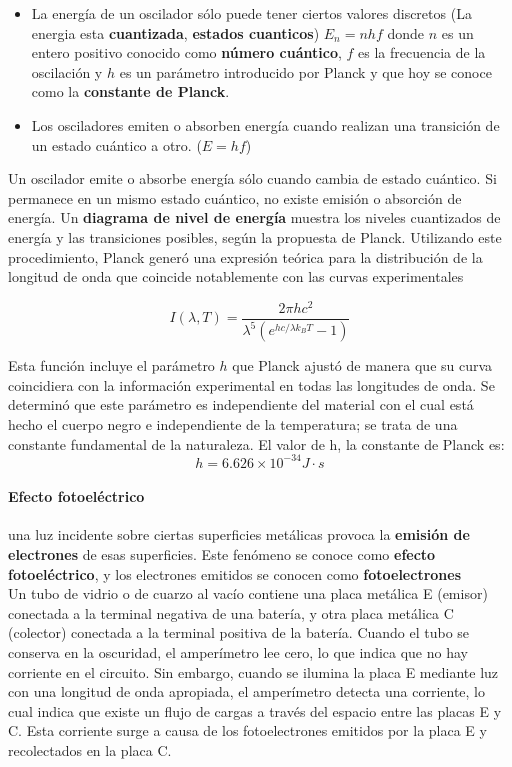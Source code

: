 \documentclass[10pt]{article}
\begin{document}
\begin{itemize}
	\item La energía de un oscilador sólo puede tener ciertos valores discretos (La energia esta \textbf{cuantizada}, \textbf{estados cuanticos}) $E_n = nhf$ donde $n$ es un entero positivo conocido como \textbf{número cuántico}, $f$ es la frecuencia de la oscilación y $h$ es un parámetro introducido por Planck y que hoy se conoce como la \textbf{constante de Planck}.
	\item Los osciladores emiten o absorben energía cuando realizan una transición de un estado cuántico a otro. ($E = hf$)
\end{itemize}

Un oscilador emite o absorbe energía sólo cuando cambia de estado cuántico. Si permanece en un mismo estado cuántico, no existe emisión o absorción de energía. Un \textbf{diagrama de nivel de energía} muestra los niveles cuantizados de energía y las transiciones posibles, según la propuesta de Planck. Utilizando este procedimiento, Planck generó una expresión teórica para la distribución de la longitud de onda que coincide notablemente con las curvas experimentales

\begin{equation*}
	I(\lambda, T) = \dfrac{2\pi hc^2}{\lambda^5 (e^{hc/\lambda k_B T}-1)}
\end{equation*}

Esta función incluye el parámetro $h$ que Planck ajustó de manera que su curva coincidiera con la información experimental en todas las longitudes de onda. Se determinó que este parámetro es independiente del material con el cual está hecho el cuerpo negro e independiente de la temperatura; se trata de una constante fundamental de la naturaleza. El valor de h, la constante de Planck es:
\begin{equation*}
		h = 6.626 \times 10^{-34} J \cdot s
\end{equation*}

\paragraph{Efecto fotoeléctrico}

una luz incidente sobre ciertas superficies metálicas provoca la \textbf{emisión de electrones} de esas superficies. Este fenómeno se conoce como \textbf{efecto fotoeléctrico}, y los electrones emitidos se conocen como \textbf{fotoelectrones}\\
\linebreak
Un tubo de vidrio o de cuarzo al vacío contiene una placa metálica E (emisor) conectada a la terminal negativa de una batería, y otra placa metálica C (colector) conectada a la terminal positiva de la batería. Cuando el tubo se conserva en la oscuridad, el amperímetro lee cero, lo que indica que no hay corriente en el circuito. Sin embargo, cuando se ilumina la placa E mediante luz con una longitud de onda apropiada, el amperímetro detecta una corriente, lo cual indica que existe un flujo de cargas a través del espacio entre las placas E y C. Esta corriente surge a causa de los fotoelectrones emitidos por la placa E y recolectados en la placa C.
\end{document}

